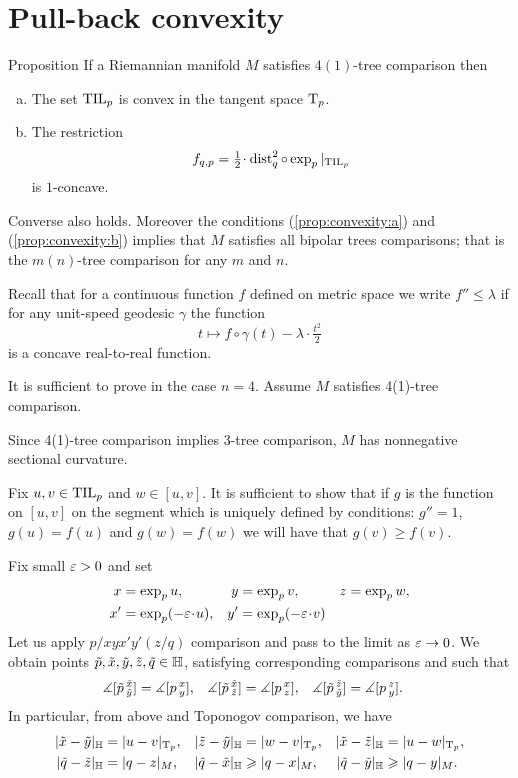 \section{Pull-back convexity}\label{convexity}

\begin{thm}{Proposition}\label{prop:convexity}
If a Riemannian manifold $M$ satisfies $4(1)$-tree comparison then
\begin{enumerate}[(a)]
\item\label{prop:convexity:a} The set $\TIL_p$ is convex in the tangent space $\T_p$.
\item\label{prop:convexity:b} The restriction  
\[f_{q,p}=\tfrac12\cdot\dist_q^2\circ\exp_p|_{\TIL_p}\] 
is $1$-concave.
\end{enumerate}

Converse also holds.
Moreover the conditions (\ref{prop:convexity:a}) and (\ref{prop:convexity:b}) implies that $M$ satisfies all bipolar trees comparisons; that is the $m(n)$-tree comparison for any $m$ and $n$.
\end{thm}

Recall that for a continuous function $f$ defined on metric space we write 
$f''\le \lambda$ if for any unit-speed geodesic $\gamma$ the function
\[t\mapsto f\circ\gamma(t)-\lambda\cdot \tfrac{t^2}{2}\]
is a concave real-to-real function.

It is sufficient to prove in the case $n=4$.
Assume $M$ satisfies 4(1)-tree comparison.

Since 4(1)-tree comparison implies 3-tree comparison,
$M$ has nonnegative sectional curvature.

Fix $u,v\in \TIL_p$ and $w\in [u,v]$.
It is sufficient to show that if $g$ is the function on $[u,v]$ on the segment which is 
uniquely defined by conditions:
$g''=1$, $g(u)=f(u)$ and $g(w)=f(w)$ we will have that $g(v)\ge f(v)$.

Fix small $\eps>0$ and set
\begin{align*}
x&=\exp_p u, 
&y&=\exp_p v, 
&z&=\exp_pw,
\\
x'&=\exp_p(-\eps\cdot  u),
&y'&=\exp_p(-\eps\cdot  v)
\end{align*}
Let us apply $p/xyx'y'(z/q)$ comparison and pass to the limit as $\eps\to 0$.
We obtain points $\~p, \~x, \~y, \~z, \~q\in\HH$, satisfying corresponding comparisons and
such that
\begin{align*}
\measuredangle[\~p\,^{\~x}_{\~y}]&= \measuredangle[p\,^{x}_{y}],
&\measuredangle[\~p\,^{\~x}_{\~z}]&= \measuredangle[p\,^{x}_{z}],
&\measuredangle[\~p\,^{\~z}_{\~y}]&= \measuredangle[p\,^{z}_{y}].
\end{align*}
In particular,
from above and Toponogov comparison, we have
\begin{align*}
|\~x-\~y|_\HH&=|u-v|_{\T_p},
&|\~z-\~y|_\HH&=|w-v|_{\T_p},
&|\~x-\~z|_\HH&=|u-w|_{\T_p},
\\
|\~q-\~z|_\HH&=|q-z|_M,
&|\~q-\~x|_\HH&\ge|q-x|_M,
&|\~q-\~y|_\HH&\ge|q-y|_M.
\end{align*}


